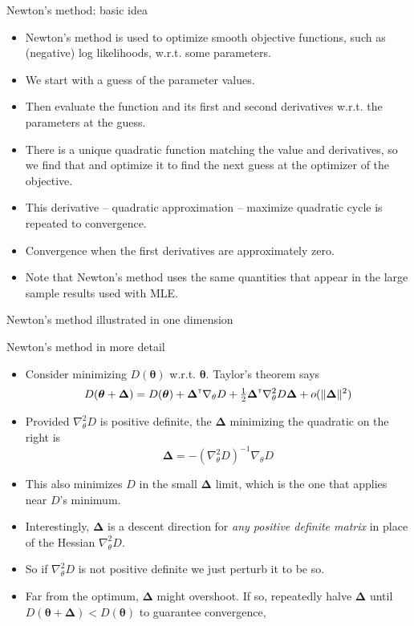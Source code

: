 \documentclass{beamer}
\newcommand{\grad }{\nabla}
\newcommand{\ts}{^{\mbox{\sf \tiny T}}}
\begin{document}
\begin{frame}{Newton's method: basic idea}
\begin{itemize}
\item Newton's method is used to optimize smooth  objective functions, such as (negative) log likelihoods, w.r.t. some parameters.
\item We start with a guess of the parameter values.
\item Then evaluate the function and its first and second derivatives w.r.t. the parameters at the guess. 
\item There is a unique quadratic function matching the value and derivatives, so we find that and optimize it to find the next guess at the optimizer of the objective.
\item This derivative -- quadratic approximation -- maximize quadratic cycle is repeated to convergence. 
\item Convergence when the first derivatives are approximately zero.
\item Note that Newton's method uses the same quantities that appear in the large sample results used with MLE.
\end{itemize}
\end{frame}

\begin{frame}{Newton's method illustrated in one dimension}
\begin{center}
\end{center}
\end{frame}

\begin{frame}{Newton's method in more detail}
\begin{itemize}
\item Consider minimizing $D({\bm \theta})$ w.r.t. $\bm \theta$. Taylor's theorem says 
$$
D({\bm \theta} + {\bm \Delta}) = D({\bm \theta}) + {\bm \Delta}\ts \grad_\theta D  + \tfrac{1}{2} {\bm \Delta} \ts \grad_\theta^2 D {\bm \Delta} + o(\|{\bm \Delta}\|^2)
$$
\item Provided $\grad_\theta^2 D$ is positive definite, the $\bm \Delta $ minimizing the quadratic on the right is  
$$
{\bm \Delta} = -(\grad_\theta^2 D)^{-1} \grad_\theta D
$$
\item This also minimizes $D$ in the small $\bm \Delta $ limit, which is the one that applies near $D$'s minimum.  
\item Interestingly, ${\bm \Delta}$ is a descent direction for {\em any positive definite matrix} in place of the Hessian $\grad_\theta^2 D$. 
\item So if $\grad_\theta^2 D$ is not positive definite we just perturb it to be so.
\item Far from the optimum, $\bm \Delta$ might overshoot. If so, repeatedly halve $\bm \Delta$ until $D({\bm \theta} + {\bm \Delta})<D({\bm \theta})$ to guarantee convergence, 

\end{itemize}
\end{frame}
\end{document}
